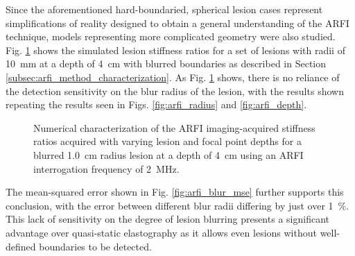 			Since the aforementioned hard-boundaried, spherical lesion cases represent simplifications of reality designed to obtain a general understanding of the ARFI technique, models representing more complicated geometry were also studied. Fig. \ref{fig:arfi_blur} shows the simulated lesion stiffness ratios for a set of lesions with radii of \SI{10}{\mm} at a depth of \SI{4}{\cm} with blurred boundaries as described in Section \ref{subsec:arfi_method_characterization}. As Fig. \ref{fig:arfi_blur} shows, there is no reliance of the detection sensitivity on the blur radius of the lesion, with the results shown repeating the results seen in Figs. \ref{fig:arfi_radius} and \ref{fig:arfi_depth}.

			\begin{figure}[!htb]
				\centering
				\caption[Numerical characterization of ARFI imaging-acquired stiffness ratio with blurred lesions]{Numerical characterization of the ARFI imaging-acquired stiffness ratios acquired with varying lesion and focal point depths for a blurred \SI{1.0}{cm} radius lesion at a depth of \SI{4}{\cm} using an ARFI interrogation frequency of \SI{2}{\MHz}.}
				\label{fig:arfi_blur}
			\end{figure}

			The mean-squared error shown in Fig. \ref{fig:arfi_blur_mse} further supports this conclusion, with the error between different blur radii differing by just over \SI{1}{\percent}. This lack of sensitivity on the degree of lesion blurring presents a significant advantage over quasi-static elastography as it allows even lesions without well-defined boundaries to be detected.

